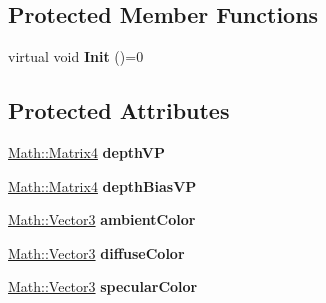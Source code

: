 \subsection*{Protected Member Functions}
\begin{DoxyCompactItemize}
\item 
\hypertarget{classBrickware_1_1Graphics_1_1InternalLight_aa8b22a879b4e31f75c0244004b8b291e}{}virtual void {\bfseries Init} ()=0\label{classBrickware_1_1Graphics_1_1InternalLight_aa8b22a879b4e31f75c0244004b8b291e}

\end{DoxyCompactItemize}
\subsection*{Protected Attributes}
\begin{DoxyCompactItemize}
\item 
\hypertarget{classBrickware_1_1Graphics_1_1InternalLight_a72254e8ba6d5bc130f41ee196e66e1d1}{}\hyperlink{classBrickware_1_1Math_1_1Matrix4}{Math\+::\+Matrix4} {\bfseries depth\+V\+P}\label{classBrickware_1_1Graphics_1_1InternalLight_a72254e8ba6d5bc130f41ee196e66e1d1}

\item 
\hypertarget{classBrickware_1_1Graphics_1_1InternalLight_a6970b9fa3da49bca66dadf6366f6ae12}{}\hyperlink{classBrickware_1_1Math_1_1Matrix4}{Math\+::\+Matrix4} {\bfseries depth\+Bias\+V\+P}\label{classBrickware_1_1Graphics_1_1InternalLight_a6970b9fa3da49bca66dadf6366f6ae12}

\item 
\hypertarget{classBrickware_1_1Graphics_1_1InternalLight_a6d55eded204c1146da572e3414d81c27}{}\hyperlink{classBrickware_1_1Math_1_1Vector3}{Math\+::\+Vector3} {\bfseries ambient\+Color}\label{classBrickware_1_1Graphics_1_1InternalLight_a6d55eded204c1146da572e3414d81c27}

\item 
\hypertarget{classBrickware_1_1Graphics_1_1InternalLight_a4ee7ad9273ab915dfbd00076acd25fb0}{}\hyperlink{classBrickware_1_1Math_1_1Vector3}{Math\+::\+Vector3} {\bfseries diffuse\+Color}\label{classBrickware_1_1Graphics_1_1InternalLight_a4ee7ad9273ab915dfbd00076acd25fb0}

\item 
\hypertarget{classBrickware_1_1Graphics_1_1InternalLight_aa305b6696b0e83e8ce66299b1e8d1c02}{}\hyperlink{classBrickware_1_1Math_1_1Vector3}{Math\+::\+Vector3} {\bfseries specular\+Color}\label{classBrickware_1_1Graphics_1_1InternalLight_aa305b6696b0e83e8ce66299b1e8d1c02}


\end{DoxyCompactItemize}
